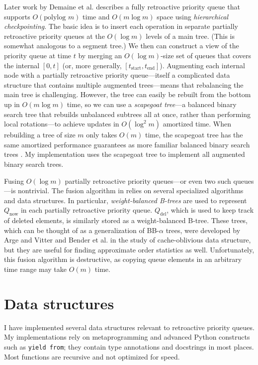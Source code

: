 \documentclass{article}
\newcommand{\Qnow}{Q_{\text{now}}}
\begin{document}
Later work by Demaine et al. \cite{demaine2015polylogarithmic} describes a fully retroactive priority queue that supports $O(\text{polylog } m)$ time and $O(m \log m)$ space using \emph{hierarchical checkpointing}. The basic idea is to insert each operation in separate partially retroactive priority queues at the $O(\log m)$ levels of a main tree. (This is somewhat analogous to a segment tree.) We then can construct a view of the priority queue at time $t$ by merging an $O(\log m)$-size set of queues that covers the internal $[0, t]$ (or, more generally, $[t_\text{start}, t_\text{end}]$). Augmenting each internal node with a partially retroactive priority queue---itself a complicated data structure that contains multiple augmented trees---means that rebalancing the main tree is challenging. However, the tree can easily be rebuilt from the bottom up in $O(m \log m)$ time, so we can use a \emph{scapegoat tree}---a balanced binary search tree that rebuilds unbalanced subtrees all at once, rather than performing local rotations---to achieve updates in $O(\log^2 m)$ amortized time. When rebuilding a tree of size $m$ only takes $O(m)$ time, the scapegoat tree has the same amortized performance guarantees as more familiar balanced binary search trees \cite{galperin1993scapegoat}. My implementation uses the scapegoat tree to implement all augmented binary search trees.

Fusing $O(\log m)$ partially retroactive priority queues---or even two such queues---is nontrivial. The fusion algorithm in \cite{demaine2015polylogarithmic} relies on several specialized algorithms and data structures. In particular, \emph{weight-balanced B-trees} are used to represent $\Qnow$ in each partially retroactive priority queue. $Q_{\text{del}}$, which is used to keep track of deleted elements, is similarly stored as a weight-balanced B-tree. These trees, which can be thought of as a generalization of BB-$\alpha$ trees, were developed by Arge and Vitter \cite{arge2003optimal} and Bender et al. \cite{bender2005cache} in the study of cache-oblivious data structure, but they are useful for finding approximate order statistics as well. Unfortunately, this fusion algorithm is destructive, as copying queue elements in an arbitrary time range may take $O(m)$ time.

\section{Data structures}
I have implemented several data structures relevant to retroactive priority queues. My implementations rely on metaprogramming and advanced Python constructs such as \texttt{yield from}; they contain type annotations and docstrings in most places. Most functions are recursive and not optimized for speed.
\end{document}
